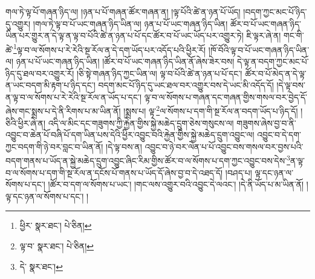 གལ་ཏེ་ལྟ་པོ་གཞན་ཉིད་ལ། །ཉན་པ་པོ་གཞན་ཚོར་གཞན་ན། །ལྟ་པོའི་ཚེ་ན་ཉན་པོ་ཡོད། །བདག་ཀྱང་མང་པོ་ཉིད་དུ་འགྱུར། །གལ་ཏེ་ལྟ་བ་པོ་ཡང་གཞན་ཉིད་ཡིན་ལ། ཉན་པ་པོ་ཡང་གཞན་ཉིད་ཡིན། ཚོར་བ་པོ་ཡང་གཞན་ཉིད་ཡིན་པར་གྱུར་ན་དེ་ལྟ་ན་ལྟ་བ་པོའི་ཚེ་ན་ཉན་པ་པོ་དང་ཚོར་བ་པོ་ཡང་ཡོད་པར་འགྱུར་ཏེ། ཇི་ལྟར་ཞེ་ན། གང་གི་ཚེ་\footnote{ཕྱིར་  སྣར་ཐང་།  པེ་ཅིན། }ལྟ་བ་ལ་སོགས་པ་རེ་རེའི་སྔ་རོལ་ན་དེ་དག་ཡོད་པར་འདོད་པའི་ཕྱིར་རོ། །ཁོ་བོའི་ལྟ་བ་པོ་ཡང་གཞན་ཉིད་ཡིན་ལ། ཉན་པ་པོ་ཡང་གཞན་ཉིད་ཡིན། །ཚོར་བ་པོ་ཡང་གཞན་ཉིད་ཡིན་ནོ་ཞེས་ཟེར་བས། དེ་ལྟ་ན་བདག་ཀྱང་མང་པོ་ཉིད་དུ་ཐལ་བར་འགྱུར་རོ། །ཅི་སྟེ་གཞན་ཉིད་ཀྱང་ཡིན་ལ། ལྟ་བ་པོའི་ཚེ་ན་ཉན་པ་པོ་དང་། ཚོར་བ་པོ་མེད་ན་དེ་ལྟ་ན་ཡང་བདག་མི་རྟག་པ་ཉིད་དང་། བདག་མང་པོ་ཉིད་དུ་ཡང་ཐལ་བར་འགྱུར་བས་དེ་ཡང་མི་འདོད་དོ། །དེ་ལྟ་བས་ན་ལྟ་བ་ལ་སོགས་པ་རེ་རེའི་སྔ་རོལ་ན་ཡོད་པ་དང་། ལྟ་བ་ལ་སོགས་པ་གཞན་དང་གཞན་གྱིས་གསལ་བར་བྱེད་དོ་ཞེས་གང་སྨྲས་པ་དེ་ནི་རིགས་པ་མ་ཡིན་ནོ། །སྨྲས་པ། ལྟ་\footnote{ལྟ་བ་  སྣར་ཐང་།  པེ་ཅིན། }ལ་སོགས་པ་དག་གི་སྔ་རོལ་ན་བདག་ཡོད་པ་ཉིད་དོ། །ཅིའི་ཕྱིར་ཞེ་ན། འདི་ལ་མིང་དང་གཟུགས་ཀྱི་རྐྱེན་གྱིས་སྐྱེ་མཆེད་དྲུག་ཅེས་གསུངས་ལ། གཟུགས་ཞེས་བྱ་བ་ནི་འབྱུང་བ་ཆེན་པོ་བཞི་པོ་དག་ཡིན་པས་དེའི་ཕྱིར་འབྱུང་བའི་རྐྱེན་གྱིས་སྐྱེ་མཆེད་དྲུག་འབྱུང་ལ། འབྱུང་བ་དེ་དག་ཀྱང་བདག་གི་ཉེ་བར་བླང་བ་ཡིན་ནོ། །དེ་ལྟ་བས་ན། འབྱུང་བ་ཉེ་བར་ལེན་པ་པོ་འབྱུང་བས་གསལ་བར་བྱས་པའི་བདག་གནས་པ་ཡོད་ན་སྐྱེ་མཆེད་དྲུག་འབྱུང་ཞིང་རིམ་གྱིས་ཚོར་བ་ལ་སོགས་པ་དག་ཀྱང་འབྱུང་བས་དེས་\footnote{དེ་  སྣར་ཐང་། }ན་ལྟ་བ་ལ་སོགས་པ་དག་གི་སྔ་རོལ་ན་དངོས་པོ་གནས་པ་ཡོད་དོ་ཞེས་བྱ་བ་དེ་འཐད་དོ། །བཤད་པ། ལྟ་དང་ཉན་ལ་སོགས་པ་དང་། །ཚོར་བ་དག་ལ་སོགས་པ་ཡང་། །གང་ལས་འགྱུར་བའི་འབྱུང་དེ་ལའང་། །དེ་ནི་ཡོད་པ་མ་ཡིན་ནོ། །ལྟ་དང་ཉན་ལ་སོགས་པ་དང་། །
